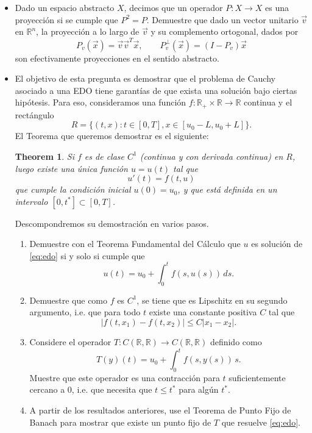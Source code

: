 \documentclass[9pt]{article}
\newcommand{\R}{\mathbb{R}}
\newcommand{\pts}[1]{[{\bf #1 puntos}] }
\newtheorem{theorem}{Theorem}
\begin{document}
\begin{itemize}
    \item\pts{2} Dado un espacio abstracto $X$, decimos que un operador $P:X\to X$ es una proyección si se cumple que $P^2 = P$. Demuestre que dado un vector unitario $\vec v$ en $\R^n$, la proyección a lo largo de $\vec v$ y su complemento ortogonal, dados por
            $$ P_v(\vec x) = \vec v\vec v^T \vec x, \qquad P_v^\perp(\vec x) = (I - P_v)\vec x$$
            son efectivamente proyecciones en el sentido abstracto. 

    \item El objetivo de esta pregunta es demostrar que el problema de Cauchy asociado a una EDO tiene garantías de que exista una solución bajo ciertas hipótesis. Para eso, consideramos una función $f:\R_+ \times \R \to \R$ continua y el rectángulo
        $$ R = \{(t,x): t \in [0,T], x \in [u_0-L, u_0+L] \}. $$
        El Teorema que queremos demostrar es el siguiente: 
        \begin{theorem}
            Si $f$ es de clase $C^1$ (continua y con derivada continua) en $R$, luego existe una única función $u=u(t)$ tal que 
            \begin{equation}\label{eq:edo}
                u'(t) = f(t, u) 
            \end{equation}
            que cumple la condición inicial $u(0)=u_0$, y que está definida en un intervalo $[0,t^*]\subset [0,T]$. 
        \end{theorem}
        Descompondremos su demostración en varios pasos. 
        \begin{enumerate}
            \item\pts{1} Demuestre con el Teorema Fundamental del Cálculo que $u$ es solución de \eqref{eq:edo} si y solo si cumple que
                $$ u(t) = u_0 + \int_0^t f(s, u(s))\,ds. $$
            \item\pts{1} Demuestre que como $f$ es $C^1$, se tiene que es Lipschitz en su segundo argumento, i.e. que para todo $t$ existe una constante positiva $C$ tal que 
                    $$ |f(t, x_1) - f(t, x_2)|\leq C |x_1 - x_2|. $$
            \item\pts{3} Considere el operador $T:C(\R,\R)\to C(\R,\R)$ definido como
                        $$ T(y)(t) = u_0 + \int_0^t f(s, y(s))\,s. $$
                    Muestre que este operador es una contracción para $t$ suficientemente cercano a $0$, i.e. que necesita que $t\leq t^*$ para algún $t^*$. 
            \item\pts{2} A partir de los resultados anteriores, use el Teorema de Punto Fijo de Banach para mostrar que existe un punto fijo de $T$ que resuelve \eqref{eq:edo}. 

\end{enumerate}
\end{itemize}
\end{document}
